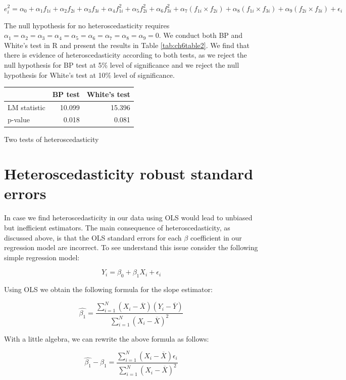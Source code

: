 \documentclass[
]{book}
\theoremstyle{definition}
\theoremstyle{definition}
\theoremstyle{definition}
\theoremstyle{definition}
\theoremstyle{remark}
\begin{document}
\[e^2_i=\alpha_0 + \alpha_1 f_{1i} + \alpha_2 f_{2i} +\alpha_3 f_{3i} + \alpha_4 f^2_{1i} +\alpha_5 f^2_{2i} + \alpha_{6}f^2_{3i} + \alpha_7 (f_{1i} \times f_{2i})+ \alpha_8 (f_{1i} \times f_{3i})+ \alpha_9 (f_{2i} \times f_{3i})+\epsilon_i\]

The null hypothesis for no heteroscedasticity requires \(\alpha_1=\alpha_2=\alpha_3=\alpha_4=\alpha_5=\alpha_6=\alpha_7=\alpha_8=\alpha_9=0\). We conduct both BP and White's test in R and present the results in Table \ref{tab:ch6table2}. We find that there is evidence of heteroscedasticity according to both tests, as we reject the null hypothesis for BP test at 5\% level of significance and we reject the null hypothesis for White's test at 10\% level of significance.

\begin{tabular}{l|r|r}
\hline
  & BP test & White's test\\
\hline
LM statistic & 10.099 & 15.396\\
\hline
p-value & 0.018 & 0.081\\
\hline
\end{tabular}

\label{tab:ch6table2} Two tests of heteroscedasticity

\hypertarget{heteroscedasticity-robust-standard-errors}{%
\section{Heteroscedasticity robust standard errors}\label{heteroscedasticity-robust-standard-errors}}

In case we find heteroscedasticity in our data using OLS would lead to unbiased but inefficient estimators. The main consequence of heteroscedasticity, as discussed above, is that the OLS standard errors for each \(\beta\) coefficient in our regression model are incorrect. To see understand this issue consider the following simple regression model:

\[Y_i=\beta_0 + \beta_1 X_i + \epsilon_i\]

Using OLS we obtain the following formula for the slope estimator:

\[\widehat{\beta_1}=\frac{\sum_{i=1}^N (X_i-\overline{X})(Y_i-\overline{Y})}{\sum_{i=1}^N (X_i-\overline{X})^2}\]

With a little algebra, we can rewrite the above formula as follows:

\[\widehat{\beta_1}-\beta_1=\frac{\sum_{i=1}^N (X_i-\overline{X})\epsilon_i}{\sum_{i=1}^N (X_i-\overline{X})^2}\]
\end{document}
